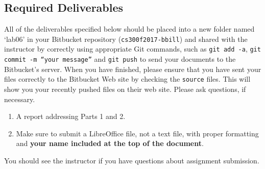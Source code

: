 \subsection*{Required Deliverables}
\vspace*{-.1in}
All of the deliverables specified below should be placed into a new folder named `lab06' in your Bitbucket repository ({\tt cs300f2017-bbill})  and shared with the instructor by correctly using  appropriate Git commands, such as {\tt git add -a}, {\tt git commit -m ``your message''} and {\tt git push} to send your documents to the Bitbucket's server. When you have finished, please ensure that you have sent your files correctly to the Bitbucket Web site by checking the {\tt source} files. This will show you your recently pushed files on their web site. Please ask questions, if necessary.
\color{red}
\begin{enumerate}
	\item A report addressing Parts 1 and 2.
	\item Make sure to submit a LibreOffice file, not a text file, with proper formatting and \textbf{your name included at the top of the document}.
\end{enumerate}
\color{black}

\noindent You should see the instructor if you have questions about assignment submission.




